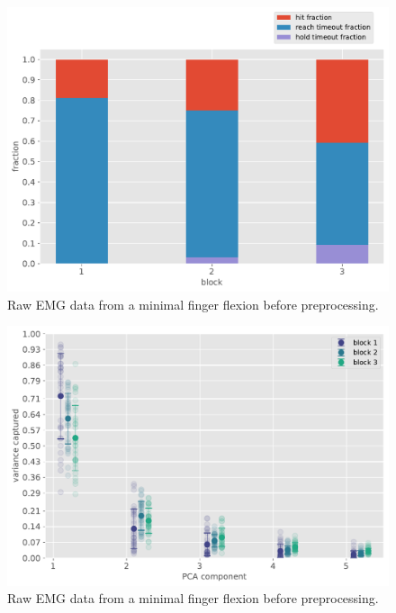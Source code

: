 \documentclass[
  a4paper,
]{article}
\makeatletter
\newcounter{figno}
\newenvironment{fignos:no-prefix-figure-caption}{
  \caption@ifcompatibility{}{
    \let\oldthefigure\thefigure
    \let\oldtheHfigure\theHfigure
    \renewcommand{\thefigure}{figno:\thefigno}
    \renewcommand{\theHfigure}{figno:\thefigno}
    \stepcounter{figno}
    \captionsetup{labelformat=empty}
  }
}{
  \caption@ifcompatibility{}{
    \captionsetup{labelformat=default}
    \let\thefigure\oldthefigure
    \let\theHfigure\oldtheHfigure
    \addtocounter{figure}{-1}
  }
}
\makeatother
\begin{document}
\begin{fignos:no-prefix-figure-caption}

\begin{figure}
\centering
\includegraphics{images/data_analysis/center_hold/hit_fraction.pdf}
\caption{Raw EMG data from a minimal finger flexion before
preprocessing.}
\end{figure}

\end{fignos:no-prefix-figure-caption}

\begin{fignos:no-prefix-figure-caption}

\begin{figure}
\centering
\includegraphics{images/data_analysis/center_hold/PCA_trial_variance.pdf}
\caption{Raw EMG data from a minimal finger flexion before
preprocessing.}
\end{figure}

\end{fignos:no-prefix-figure-caption}
\end{document}
